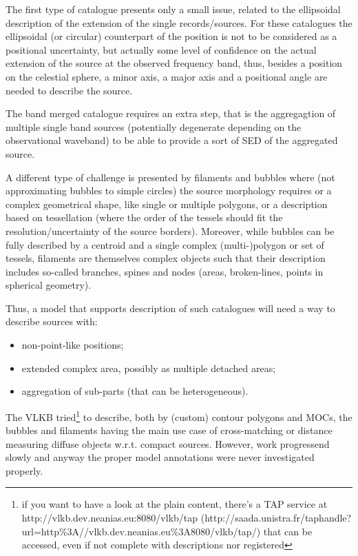\documentclass[11pt,a4paper]{ivoa}
\begin{document}
The first type of catalogue presents only a small issue, related to the
ellipsoidal description of the extension of the single records/sources.
For these catalogues the ellipsoidal (or circular) counterpart of the position is not
to be considered as a positional uncertainty, but actually some level of
confidence on the actual extension of the source at the observed
frequency band, thus, besides a position on the celestial sphere, a minor axis,
a major axis and a positional angle are needed to describe the source.

The band merged catalogue requires an extra step, that is the
aggregagtion of multiple single band sources (potentially degenerate
depending on the observational waveband) to be able to provide a sort
of SED of the aggregated source.

A different type of challenge is presented by filaments and bubbles
where (not approximating bubbles to simple circles) the source
morphology requires or a complex geometrical shape, like single or
multiple polygons, or a description based on tessellation (where the
order of the tessels should fit the resolution/uncertainty of the source
borders). Moreover, while bubbles can be fully described by a centroid
and a single complex (multi-)polygon or set of tessels, filaments are
themselves complex objects such that their description includes
so-called branches, spines and nodes (areas, broken-lines, points in
spherical geometry).

Thus, a model that supports description of such catalogues will need a
way to describe sources with:
\begin{itemize}
	\item non-point-like positions;
	\item extended complex area, possibly as multiple detached areas;
	\item aggregation of sub-parts (that can be heterogeneous).
\end{itemize}

The VLKB tried\footnote{if you want to have a look at the plain
content, there's a TAP service at
http://vlkb.dev.neanias.eu:8080/vlkb/tap (http://saada.unistra.fr/taphandle?url=http\%3A//vlkb.dev.neanias.eu\%3A8080/vlkb/tap/) that can be accessed, even if
not complete with descriptions nor registered} to describe, both by
(custom) contour polygons and MOCs,
the bubbles and filaments having the main use case of cross-matching or
distance measuring diffuse objects w.r.t. compact sources. However, work
progressend slowly and anyway the proper model annotations were never
investigated properly.
\end{document}
